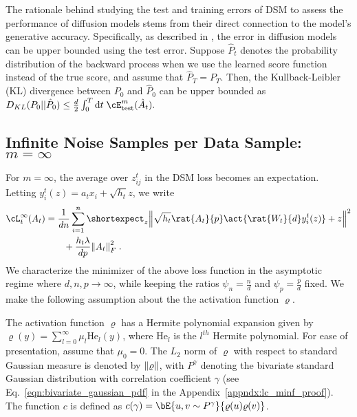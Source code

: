 The rationale behind studying the test and training errors of DSM to assess the performance of diffusion models stems from their direct connection to the model's generative accuracy. Specifically, as described in \cite{song_maximum_2021}, the error in diffusion models can be upper bounded using the test error. Suppose $\hat{P}_t$ denotes the probability distribution of the backward process when we use the learned score function instead of the true score, and assume that $\hat{P}_T = P_T$. Then, the Kullback-Leibler (KL) divergence between $P_0$ and $\hat{P}_0$ can be upper bounded as
    $D_{KL}(P_0||\hat{P}_0)\le \frac{d}{2}\int_0^T\dd t\; \cE^m_{\text{test}}(\hat{A}_t).$

\subsection{Infinite Noise Samples per Data Sample: $m=\infty$}
For $m=\infty$, the average over $z^t_{ij}$ in the DSM loss becomes an expectation. Letting $y^t_i(z) = a_tx_i+\sqrt{h_t}z$, we write
\begin{align}\label{eqn:dsm_loss_rfm_minf}
    \cL_t^\infty(A_t) &= \frac{1}{dn}\sum_{i=1}^{n}{\shortexpect_{z}{\norm{\sqrt{h_t}\rat{A_t}{p}\act{\rat{W_t}{d}y^t_i(z)}+z}^2}}\nonumber\\
    &\qquad +\frac{h_t\lambda}{dp}\norm{A_t}_F^2 \;.
\end{align}
We characterize the minimizer of the above loss function in the asymptotic regime where $d,n,p\rightarrow\infty$, while keeping the ratios $\psi_n = \frac{n}{d}$ and $\psi_p = \frac{p}{d}$ fixed. We make the following assumption about the the activation function $\varrho$.

\begin{assumption}\label{assmptn:activation_fn}
   The activation function $\varrho$ has a Hermite polynomial expansion given by $\varrho(y) = \sum_{l=0}^\infty\mu_l \text{He}_l(y)$, where $\text{He}_l$ is the $l^{th}$ Hermite polynomial. For ease of presentation, assume that $\mu_0=0$. The $L_2$ norm of $\varrho$ with respect to standard Gaussian measure is denoted by $\norm{\varrho}$, with $P^\gamma$ denoting the bivariate standard Gaussian distribution with correlation coefficient $\gamma$ (see Eq.~\eqref{eqn:bivariate_gaussian_pdf} in the Appendix~\ref{appndx:lc_minf_proof}). The function $c$ is defined as $c(\gamma) = \bE{u,v\sim P^\gamma}{\varrho(u)\varrho(v)}$.  
\end{assumption}
 
